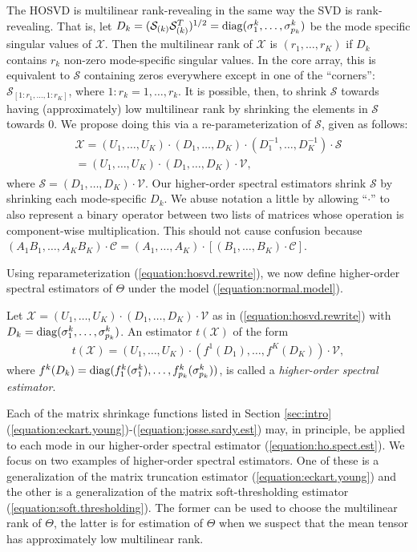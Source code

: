 The HOSVD is multilinear rank-revealing in the same way the SVD is
rank-revealing. That is, let $D_k =
(\mathcal{S}_{(k)}\mathcal{S}_{(k)}^T)^{1/2} =
\operatorname*{diag}(\sigma_1^k,\ldots,\sigma_{p_k}^k)$ be the mode specific singular
values of $\mathcal{X}$. Then the multilinear rank of $\mathcal{X}$ is
$(r_1,\ldots,r_K)$ if $D_k$ contains $r_k$ non-zero mode-specific
singular values. In the core array, this is equivalent to
$\mathcal{S}$ containing zeros everywhere except in one of the
``corners'': $\mathcal{S}_{[1:r_1,\ldots,1:r_K]}$, where $1:r_k =
1,\ldots,r_k$. It is possible, then, to shrink $\mathcal{S}$ towards
having (approximately) low multilinear rank by shrinking the elements
in $\mathcal{S}$ towards $0$. We propose doing this via a
re-parameterization of $\mathcal{S}$, given as follows:
\begin{align}
  \label{equation:hosvd.rewrite}
  \begin{split}
    \mathcal{X} = (U_1,\ldots,U_K) \cdot (D_1,\ldots,D_K)\cdot (D_1^{-1},\ldots,D_K^{-1})\cdot \mathcal{S}\\
    = (U_1,\ldots,U_K) \cdot (D_1,\ldots,D_K)\cdot \mathcal{V},
  \end{split}
\end{align}
where $\mathcal{S} = (D_1,\ldots,D_K)\cdot \mathcal{V}$. Our
higher-order spectral estimators shrink $\mathcal{S}$ by shrinking
each mode-specific $D_k$. We abuse notation a little by allowing
``$\cdot$'' to also represent a binary operator between two lists of
matrices whose operation is component-wise multiplication. This should
not cause confusion because $(A_1B_1,\ldots,A_KB_K) \cdot \mathcal{C}
= (A_1,\ldots,A_K) \cdot [(B_1,\ldots,B_K) \cdot \mathcal{C}]$.

Using reparameterization (\ref{equation:hosvd.rewrite}), we now define
higher-order spectral estimators of $\Theta$ under the model
(\ref{equation:normal.model}).
\begin{definition}
  Let $\mathcal{X} = (U_1,\ldots,U_K) \cdot (D_1,\ldots,D_K)\cdot \mathcal{V}$ as in (\ref{equation:hosvd.rewrite}) with $D_k = \operatorname*{diag}(\sigma_1^k,\ldots,\sigma_{p_k}^k)$. An estimator $t(\mathcal{X})$ of the form
  \begin{align}
    \label{equation:ho.spect.est}
    t(\mathcal{X}) = (U_1,\ldots,U_K) \cdot (f^1(D_1),\ldots,f^K(D_K))\cdot \mathcal{V},
  \end{align}
  where $f^k(D_k) =
  \operatorname*{diag}(f_1^k(\sigma_1^k),\ldots,f_{p_k}^k(\sigma_{p_k}^k))$, is
  called a \emph{higher-order spectral estimator}.
\end{definition}

Each of the matrix shrinkage functions listed in Section
\ref{sec:intro}
(\ref{equation:eckart.young})-(\ref{equation:josse.sardy.est}) may, in
principle, be applied to each mode in our higher-order spectral
estimator (\ref{equation:ho.spect.est}). We focus on two examples of
higher-order spectral estimators. One of these is a generalization of
the matrix truncation estimator (\ref{equation:eckart.young}) and the
other is a generalization of the matrix soft-thresholding estimator
(\ref{equation:soft.thresholding}). The former can be used to choose
the multilinear rank of $\Theta$, the latter is for estimation of
$\Theta$ when we suspect that the mean tensor has approximately low
multilinear rank.
